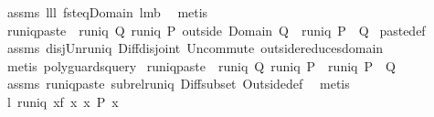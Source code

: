 \begin{isabellebody}
%
\isadelimproof
%
\endisadelimproof
%
\isatagproof
{}\isamarkupfalse%
\ assms\ lll{}{}\ fst{\isacharunderscore}eq{\isacharunderscore}Domain\ lm{}{}{}b\ \isamarkupfalse%
\ metis%
\endisatagproof
{\isafoldproof}%
%
\isadelimproof
\isanewline
%
\endisadelimproof
\isanewline
{}\isamarkupfalse%
\ runiq{\isacharunderscore}paste{}{\isacharcolon}\ \ {\isachardoublequoteopen}runiq\ Q{\isachardoublequoteclose}\ {\isachardoublequoteopen}runiq\ {\isacharparenleft}P\ outside\ Domain\ Q{\isacharparenright}{\isachardoublequoteclose}\ \ {\isachardoublequoteopen}runiq\ {\isacharparenleft}P\ {\isacharplus}{\isacharasterisk}\ Q{\isacharparenright}{\isachardoublequoteclose}\isanewline
%
\isadelimproof
%
\endisadelimproof
%
\isatagproof
{}\isamarkupfalse%
\ paste{\isacharunderscore}def\ \isamarkupfalse%
\ assms\ disj{\isacharunderscore}Un{\isacharunderscore}runiq\ Diff{\isacharunderscore}disjoint\ Un{\isacharunderscore}commute\ outside{\isacharunderscore}reduces{\isacharunderscore}domain\isanewline
{}\isamarkupfalse%
\ {\isacharparenleft}metis\ {\isacharparenleft}poly{\isacharunderscore}guards{\isacharunderscore}query{\isacharparenright}{\isacharparenright}%
\endisatagproof
{\isafoldproof}%
%
\isadelimproof
\isanewline
%
\endisadelimproof
\isanewline
{}\isamarkupfalse%
\ runiq{\isacharunderscore}paste{}{\isacharcolon}\ \ {\isachardoublequoteopen}runiq\ Q{\isachardoublequoteclose}\ {\isachardoublequoteopen}runiq\ P{\isachardoublequoteclose}\ \ {\isachardoublequoteopen}runiq\ {\isacharparenleft}P\ {\isacharplus}{\isacharasterisk}\ Q{\isacharparenright}{\isachardoublequoteclose}\isanewline
%
\isadelimproof
%
\endisadelimproof
%
\isatagproof
{}\isamarkupfalse%
\ assms\ runiq{\isacharunderscore}paste{}\ subrel{\isacharunderscore}runiq\ Diff{\isacharunderscore}subset\ Outside{\isacharunderscore}def\ \isamarkupfalse%
\ {\isacharparenleft}metis{\isacharparenright}%
\endisatagproof
{\isafoldproof}%
%
\isadelimproof
\isanewline
%
\endisadelimproof
\isanewline
{}\isamarkupfalse%
\ l{}{}{\isacharcolon}\ {\isachardoublequoteopen}runiq\ {\isacharbraceleft}{\isacharparenleft}x{\isacharcomma}f\ x{\isacharparenright}{\isacharbar}\ x{\isachardot}\ P\ x{\isacharbraceright}{\isachardoublequoteclose}%
\isadelimproof
\ %
\endisadelimproof
%

\end{isabellebody}
